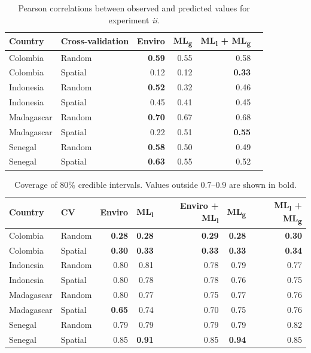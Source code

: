 \documentclass[review]{elsarticle}
\begin{document}





\begin{table}[t!]

\centering
\begin{tabular}{llrrrr}
Country &  Cross-validation & Enviro &   ML\textsubscript{g} & ML\textsubscript{l} + ML\textsubscript{g} \\
\hline 
 Colombia & Random &  \textbf{0.59} &0.55 & 0.58 \\
 Colombia &  Spatial &  0.12 &  0.12 & \textbf{0.33}\\
 Indonesia &  Random &  \textbf{0.52} & 0.32 & 0.46 \\
 Indonesia &  Spatial &  0.45 & 0.41 & 0.45 \\
 Madagascar &  Random &  \textbf{0.70} &  0.67 & 0.68 \\
 Madagascar &  Spatial &  0.22 &  0.51 & \textbf{0.55}\\
 Senegal &  Random &  \textbf{0.58} &  0.50 & 0.49 \\
 Senegal &  Spatial &   \textbf{0.63} & 0.55 & 0.52 \\

\end{tabular}
\caption{Pearson correlations between observed and predicted values for experiment \emph{ii}. }
\label{t:results2}

\end{table}



\begin{table}[t!]

\centering
\begin{tabular}{llrrrrr}
Country &  CV & Enviro & ML\textsubscript{l} &  Enviro + ML\textsubscript{l} & ML\textsubscript{g} & ML\textsubscript{l} + ML\textsubscript{g} \\
\hline 
 Colombia & Random & \textbf{0.28} & \textbf{0.28} & \textbf{0.29} & \textbf{0.28} & \textbf{0.30} \\
 Colombia &  Spatial & \textbf{0.30} & \textbf{0.33}  & \textbf{0.33} & \textbf{0.33} & \textbf{0.34}  \\
 Indonesia & Random &0.80 & 0.81& 0.78& 0.79& 0.77  \\
 Indonesia & Spatial & 0.80 & 0.78& 0.78& 0.76& 0.75  \\
 Madagascar &  Random & 0.80 & 0.77& 0.75& 0.77& 0.76 \\
 Madagascar & Spatial & \textbf{0.65} & 0.74& 0.70& 0.75 & 0.76   \\
 Senegal & Random &0.79 & 0.79& 0.79& 0.79& 0.82 \\
 Senegal & Spatial & 0.85 & \textbf{0.91}& 0.85& \textbf{0.94} & 0.85  \\
\end{tabular}
\caption{Coverage of 80\% credible intervals. Values outside 0.7--0.9 are shown in bold.}
\label{t:coverage}
\end{table}
\end{document}
